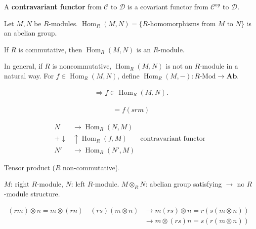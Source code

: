\documentclass[11pt, a4paper]{report}
\begin{document}
\begin{definition}
A \textbf{contravariant functor} from $\mathcal{C}$ to $\mathcal{D}$ is a covariant functor from $\mathcal{C}^{\mathrm{op}}$ to $\mathcal{D}$.
\end{definition}

\begin{example}
Let $M, N$ be $R$-modules. $\operatorname{Hom}_{R}(M, N) = \{R\text{-homomorphisms from } M \text{ to } N\}$ is an abelian group.
\end{example}

\begin{remark}
If $R$ is commutative, then $\operatorname{Hom}_{R}(M, N)$ is an $R$-module.

In general, if $R$ is noncommutative, $\operatorname{Hom}_{R}(M, N)$ is not an $R$-module in a natural way. For $f \in \operatorname{Hom}_{R}(M, N)$, define $\operatorname{Hom}_{R}(M, -) \colon R\text{-}\mathrm{Mod} \to \mathbf{Ab}$.
\end{remark}
\[
\begin{aligned}
& \Rightarrow f \in \operatorname{Hom}_{R}(M, N).
\end{aligned}
\]

\[
\begin{aligned}
& = f(srm)
\end{aligned}
\]

\[
\begin{aligned}
N & \xrightarrow{\quad} \operatorname{Hom}_{R}(N, M) \\
{\scriptstyle +}\downarrow & \uparrow {\scriptstyle \operatorname{Hom}_{R}(f, M)} \\
N' & \xrightarrow{\quad} \operatorname{Hom}_{R}(N', M)
\end{aligned} \text{ contravariant functor}
\]


\begin{definition}
Tensor product ($R$ non-commutative).

$M$: right $R$-module, $N$: left $R$-module.
$M \otimes_{R} N$: abelian group satisfying $\to$ no $R$-module structure.

\[
\begin{aligned}
(rm) \otimes n = m \otimes (rn) \quad (rs)(m \otimes n) & \to m(rs) \otimes n = r(s(m \otimes n)) \\
& \to m \otimes (rs)n = s(r(m \otimes n))
\end{aligned}
\]

\end{definition}
\end{document}
